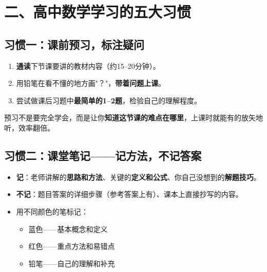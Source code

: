 \documentclass[12pt, a4paper]{ctexart}
\begin{document}
\section*{\textcolor{mainblue}{二、高中数学学习的五大习惯}}

\subsection*{习惯一：课前预习，标注疑问}

\begin{knowledgebox}[预习的方法]
\begin{enumerate}[leftmargin=2.5em]
  \item \textbf{通读}下节课要讲的教材内容（约15--20分钟）。
  \item 用铅笔在看不懂的地方画"？"，\textbf{带着问题上课}。
  \item 尝试做课后习题中\textbf{最简单的1--2题}，检验自己的理解程度。
\end{enumerate}
\end{knowledgebox}

\begin{tipbox}[预习的真正目的]
预习不是要完全学会，而是让你\textbf{知道这节课的难点在哪里}，上课时就能有的放矢地听，效率翻倍。
\end{tipbox}

\subsection*{习惯二：课堂笔记——记方法，不记答案}

\begin{knowledgebox}[高效笔记法]
\begin{itemize}[leftmargin=2em]
  \item \textbf{记}：老师讲解的\textbf{思路和方法}、关键的\textbf{定义和公式}、你自己没想到的\textbf{解题技巧}。
  \item \textbf{不记}：题目答案的详细步骤（参考答案上有）、课本上直接抄写的内容。
  \item 用不同颜色的笔标记：
  \begin{itemize}
    \item 蓝色——基本概念和定义
    \item 红色——重点方法和易错点
    \item 铅笔——自己的理解和补充
  \end{itemize}
\end{itemize}
\end{knowledgebox}
\end{document}
